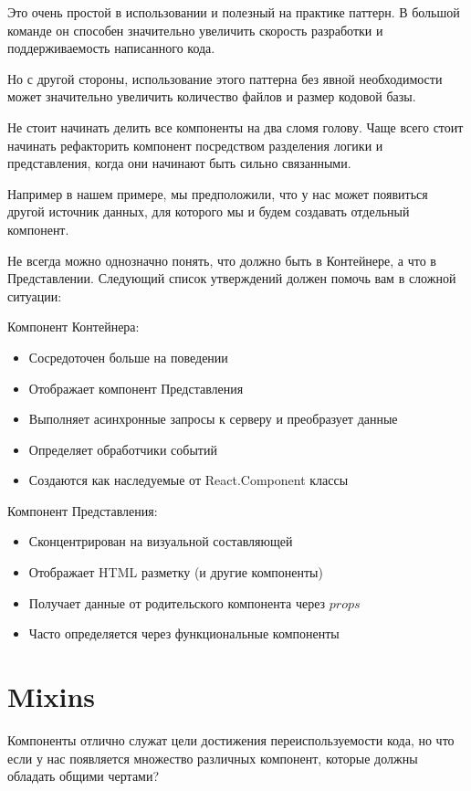 Это очень простой в использовании и полезный на практике паттерн. В большой команде он способен значительно увеличить скорость разработки и поддерживаемость написанного кода.

Но с другой стороны, использование этого паттерна без явной необходимости может значительно увеличить количество файлов и размер кодовой базы.

Не стоит начинать делить все компоненты на два сломя голову. Чаще всего стоит начинать рефакторить компонент посредством разделения логики и представления, когда они начинают быть сильно связанными. 

Например в нашем примере, мы предположили, что у нас может появиться другой источник данных, для которого мы и будем создавать отдельный компонент.

Не всегда можно однозначно понять, что должно быть в Контейнере, а что в Представлении. Следующий список утверждений должен помочь вам в сложной ситуации:

Компонент Контейнера:

\begin{itemize}
  \item Сосредоточен больше на поведении
  \item Отображает компонент Представления
  \item Выполняет асинхронные запросы к серверу и преобразует данные
  \item Определяет обработчики событий
  \item Создаются как наследуемые от React.Component классы
\end{itemize}


Компонент Представления:

\begin{itemize}
  \item Сконцентрирован на визуальной составляющей 
  \item Отображает HTML разметку (и другие компоненты)
  \item Получает данные от родительского компонента через $props$
  \item Часто определяется через функциональные компоненты
\end{itemize}


\section{Mixins}

Компоненты отлично служат цели достижения переиспользуемости кода, но что если у нас появляется множество различных компонент, которые должны обладать общими чертами?


